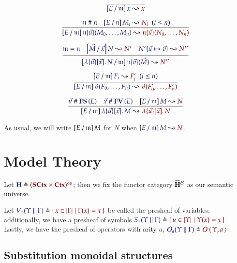 \documentclass[11pt]{article}
\theoremstyle{definition}
\theoremstyle{remark}
\numberwithin{equation}{section}
\newcommand\HypCat{\mathbf{H}}
\begin{document}
\begin{gather*}
  \infer{
    \IsSubst{E}{\MV{m}}{x}{x}
  }{
  }
\\[6pt]
  \infer{
    \IsSubst{E}{\MV{m}}{
      \MApp{\MV{n}}{\vec{u}}{M_0,\dots,M_n}
    }{
      \MApp{\MV{n}}{\vec{u}}{N_0,\dots,N_n}
    }
  }{
    \IsApart{\MV{m}}{\MV{n}}
&
    \HypJ{
      \IsSubst{E}{\MV{n}}{M_i}{N_i}
    }{
      \Leq{i}{n}
    }
  }
\\[6pt]
  \infer{
    \IsSubst{
      \MkBTm{\vec{u}}{\vec{x}}{N}
    }{\MV{m}}{
      \MApp{\MV{n}}{\vec{v}}{\vec{M}}
    }{
      N''
    }
  }{
    \IsEq{\MV{m}}{\MV{n}}
&
    \IsSubst{\vec{M}}{\vec{x}}{N}{N'}
&
    \IsRenaming{\vec{u}\mapsto\vec{v}}{N'}{N''}
  }\\[6pt]
  \infer{
    \IsSubst{E}{\MV{m}}{
      \App{\vartheta}{F_0,\dots,F_n}
    }{
      \App{\vartheta}{F'_0,\dots,F'_n}
    }
  }{
    \HypJ{
      \IsSubst{E}{\MV{m}}{F_i}{F'_i}
    }{
      \Leq{i}{n}
    }
  }
\\[6pt]
  \infer{
    \IsSubst{E}{\MV{m}}{
      \MkBTm{\vec{u}}{\vec{x}}{M}
    }{
      \MkBTm{\vec{u}}{\vec{x}}{N}
    }
  }{
    \IsApart{\vec{u}}{\FS{E}}
&
    \IsApart{\vec{x}}{\FV{E}}
&
    \IsSubst{E}{\MV{m}}{M}{N}
  }
\end{gather*}

As usual, we will write $\left[E\, /\, \mathfrak{m}\right]M$ for $N$ when
$\IsSubst{E}{\MV{m}}{M}{N}$.

\section{Model Theory}

Let $\Define{\HypCat}{\OpCat{(\SCtx\times\Ctx)}}$; then we fix the functor
category $\widehat{\HypCat}^\Sorts$ as our semantic universe.

Let $\Define{V_\tau(\Upsilon\parallel\Gamma)}{\MkSet{x\in\Dom\Gamma\mid
    \Gamma(x)=\tau}}$ be called the presheaf of variables; additionally, we have
a presheaf of symbols
$\Define{S_\tau(\Upsilon\parallel\Gamma)}{\MkSet{u\in\Dom\Upsilon\mid
    \Upsilon(x)=\tau}}$. Lastly, we have the presheaf of operators with arity
$a$,
$\Define{\Operators_a(\Upsilon\parallel\Gamma)}{\Operators\Pair{\Upsilon}{a}}$

\subsection{Substitution monoidal structures}
\newcommand\SymPsh{\mathbf{S}}
\newcommand\VarPsh{\mathbf{V}}
\end{document}
